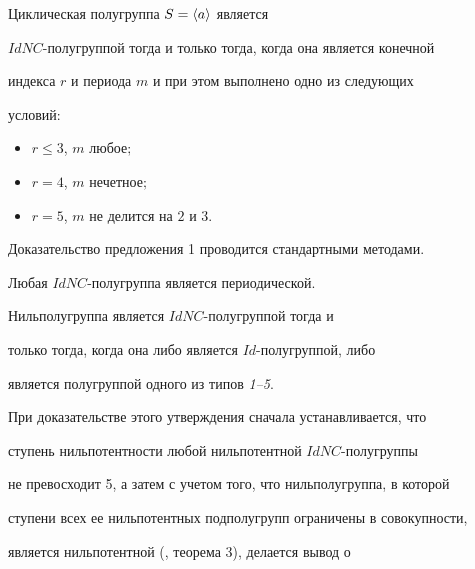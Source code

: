 \begin{prop} Циклическая полугруппа $S = \langle a\rangle$ является


$IdNC$-полугруппой тогда и только тогда, когда она является конечной


индекса $r$ и периода $m$ и при этом выполнено одно из следующих


условий$:$


\begin{itemize}


\item[1)] $r\le 3$, $m$ любое$;$


\item[2)] $r=4$, $m$ нечетное$;$


\item[3)] $r=5$, $m$ не делится на $2$ и $3$.


\end{itemize}


\end{prop}





Доказательство предложения 1 проводится стандартными методами.





\begin{cor} Любая $IdNC$-полугруппа является периодической.


\end{cor}





\begin{prop} Нильполугруппа является $IdNC$-полугруппой тогда и


только тогда, когда она либо является $Id$-полугруппой, либо


является полугруппой одного из типов {\em 1--5}.


\end{prop}





При доказательстве этого утверждения сначала устанавливается, что


ступень нильпотентности любой нильпотентной $IdNC$-полугруппы


не превосходит 5, а затем с учетом того, что нильполугруппа, в которой


ступени всех ее нильпотентных подполугрупп ограничены в совокупности,


является нильпотентной (\cite {8}, теорема 3), делается вывод о


